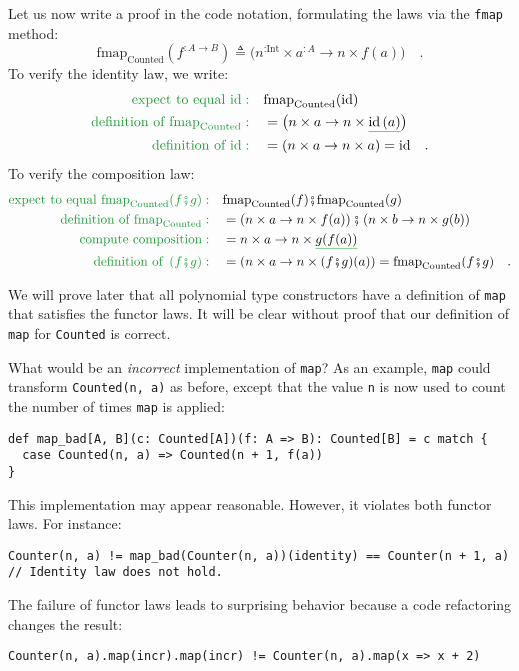 Let us now write a proof in the code notation, formulating the laws
via the \lstinline!fmap! method:
\[
\text{fmap}_{\text{Counted}}(f^{:A\rightarrow B})\triangleq\big(n^{:\text{Int}}\times a^{:A}\rightarrow n\times f(a)\big)\quad.
\]
To verify the identity law, we write:
\begin{align*}
{\color{greenunder}\text{expect to equal }\text{id}:}\quad & \text{fmap}_{\text{Counted}}(\text{id})\\
{\color{greenunder}\text{definition of }\text{fmap}_{\text{Counted}}:}\quad & =\big(n\times a\rightarrow n\times\gunderline{\text{id}\,(a)}\big)\\
{\color{greenunder}\text{definition of }\text{id}:}\quad & =\left(n\times a\rightarrow n\times a\right)=\text{id}\quad.
\end{align*}
To verify the composition law:
\begin{align*}
{\color{greenunder}\text{expect to equal }\text{fmap}_{\text{Counted}}(f\bef g):}\quad & \text{fmap}_{\text{Counted}}(f)\bef\text{fmap}_{\text{Counted}}(g)\\
{\color{greenunder}\text{definition of }\text{fmap}_{\text{Counted}}:}\quad & =\left(n\times a\rightarrow n\times f(a)\right)\bef\left(n\times b\rightarrow n\times g(b)\right)\\
{\color{greenunder}\text{compute composition}:}\quad & =n\times a\rightarrow n\times\gunderline{g(f(a))}\\
{\color{greenunder}\text{definition of }\left(f\bef g\right):}\quad & =\left(n\times a\rightarrow n\times(f\bef g)(a)\right)=\text{fmap}_{\text{Counted}}(f\bef g)\quad.
\end{align*}

We will prove later that all polynomial type constructors have a definition
of \lstinline!map! that satisfies the functor laws. It will be clear
without proof that our definition of \lstinline!map! for \lstinline!Counted!
is correct. 

What would be an \emph{incorrect} implementation of \lstinline!map!?
As an example, \lstinline!map! could transform \lstinline!Counted(n, a)!
as before, except that the value \lstinline!n! is now used to count
the number of times \lstinline!map! is applied:
\begin{lstlisting}
def map_bad[A, B](c: Counted[A])(f: A => B): Counted[B] = c match {
  case Counted(n, a) => Counted(n + 1, f(a))
}
\end{lstlisting}
This implementation may appear reasonable. However, it violates both
functor laws. For instance:
\begin{lstlisting}
Counter(n, a) != map_bad(Counter(n, a))(identity) == Counter(n + 1, a) // Identity law does not hold.
\end{lstlisting}
The failure of functor laws leads to surprising behavior because a
code refactoring changes the result:
\begin{lstlisting}
Counter(n, a).map(incr).map(incr) != Counter(n, a).map(x => x + 2)
\end{lstlisting}

